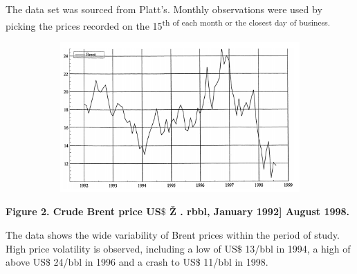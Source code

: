 \documentclass[12pt,twoside]{article}
\begin{document}
\begin{justify}
{\fontsize{11pt}{13.2pt}\selectfont The data set was sourced from Platt’s. Monthly observations were used by picking the prices recorded on the 15\textsuperscript{th of each month or the closest day of business.}\par}
\end{justify}\par




\begin{figure}[H]
	\begin{Center}
		\includegraphics[width=4.83in,height=2.26in]{./media/image2.png}
	\end{Center}
\end{figure}



{\fontsize{11pt}{13.2pt}\selectfont \par}\par

\begin{Center}
{\fontsize{11pt}{13.2pt}\selectfont \textbf{Figure 2. Crude Brent price US$\$$  Ž . rbbl, January 1992] August 1998.}\par}
\end{Center}\par

\begin{justify}
{\fontsize{11pt}{13.2pt}\selectfont The data shows the wide variability of Brent prices within the period of study. High price volatility is observed, including a low of US$\$$ 13/bbl in 1994, a high of above US$\$$ 24/bbl in 1996 and a crash to US$\$$ 11/bbl in 1998.\par}
\end{justify}\par
\end{document}
